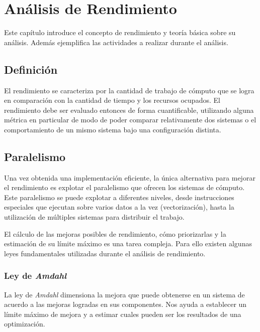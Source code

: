\documentclass[a4paper]{report}
\begin{document}
\chapter{Análisis de Rendimiento}\label{chapter:analysis}

Este capítulo introduce el concepto de rendimiento y teoría básica sobre su análisis.
Además ejemplifica las actividades a realizar durante el análisis.

\section{Definición}

El rendimiento se caracteriza por la cantidad de trabajo de cómputo que se
logra en comparación con la cantidad de tiempo y los recursos ocupados.
El rendimiento debe ser evaluado entonces de forma cuantificable, utilizando alguna
métrica en particular de modo de poder comparar relativamente dos sistemas o
el comportamiento de un mismo sistema bajo una configuración distinta.

\section{Paralelismo}

Una vez obtenida una implementación eficiente, la única alternativa para mejorar el rendimiento es explotar el paralelismo que
ofrecen los sistemas de cómputo. Este paralelismo se puede explotar a diferentes niveles, desde instrucciones especiales que ejecutan sobre varios
datos a la vez (vectorización), hasta la utilización de múltiples sistemas para distribuir el trabajo.

\bigskip

 El cálculo de las mejoras posibles de rendimiento, cómo priorizarlas y la estimación de su límite máximo es una tarea compleja. Para ello existen algunas leyes fundamentales utilizadas durante el análisis de rendimiento.

\subsection{Ley de {\it Amdahl}}

 La ley de {\it Amdahl} \cite{amdahl} dimensiona la mejora que puede obtenerse en un sistema de acuerdo a las mejoras logradas en sus componentes. Nos ayuda a establecer un límite máximo de mejora y a estimar cuales pueden ser los resultados de una optimización.

\bigskip
\end{document}
